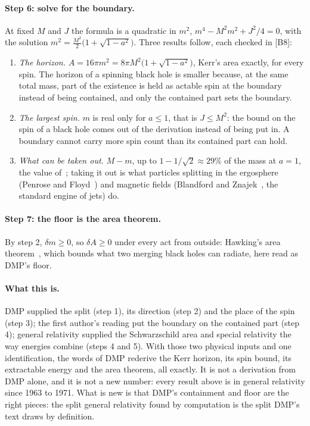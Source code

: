 \documentclass[11pt,a4paper]{article}
\theoremstyle{definition}
\theoremstyle{remark}
\newcommand{\chk}[1]{\textsf{[#1]}}
\begin{document}
\paragraph{Step 6: solve for the boundary.} At fixed $M$ and $J$ the formula is a quadratic in $m^2$, $m^4-M^2m^2+J^2/4=0$, with the
solution $m^2=\tfrac{M^2}{2}\bigl(1+\sqrt{1-a^2}\bigr)$. Three results follow, each checked in \chk{B8}:
\begin{enumerate}[nosep]
\item \emph{The horizon.} $A=16\pi m^2=8\pi M^2\bigl(1+\sqrt{1-a^2}\bigr)$, Kerr's area exactly, for every spin. The horizon of a spinning
black hole is smaller because, at the same total mass, part of the existence is held as actable spin at the boundary instead of being
contained, and only the contained part sets the boundary.
\item \emph{The largest spin.} $m$ is real only for $a\le1$, that is $J\le M^2$: the bound on the spin of a black hole comes out of the
derivation instead of being put in. A boundary cannot carry more spin count than its contained part can hold.
\item \emph{What can be taken out.} $M-m$, up to $1-1/\sqrt2\approx29\%$ of the mass at $a=1$, the value of~\cite{cr}; taking it out is
what particles splitting in the ergosphere (Penrose and Floyd~\cite{penrosefloyd}) and magnetic fields (Blandford and Znajek~\cite{bz},
the standard engine of jets) do.
\end{enumerate}

\paragraph{Step 7: the floor is the area theorem.} By step 2, $\delta m\ge0$, so $\delta A\ge0$ under every act from outside: Hawking's
area theorem~\cite{hawkingarea}, which bounds what two merging black holes can radiate, here read as DMP's floor.

\paragraph{What this is.} DMP supplied the split (step 1), its direction (step 2) and the place of the spin (step 3); the first author's
reading put the boundary on the contained part (step 4); general relativity supplied the Schwarzschild area and special relativity the
way energies combine (steps 4 and 5). With those two physical inputs and one identification, the words of DMP rederive the Kerr horizon,
its spin bound, its extractable energy and the area theorem, all exactly. It is not a derivation from DMP alone, and it is not a new
number: every result above is in general relativity since 1963 to 1971. What is new is that DMP's containment and floor are the right
pieces: the split general relativity found by computation is the split DMP's text draws by definition.
\end{document}
